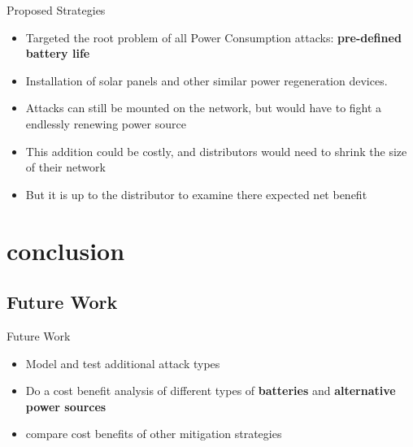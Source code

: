 \documentclass{beamer}
\begin{document}
\begin{frame}{Proposed Strategies}

\begin{itemize}

	\item Targeted the root problem of all Power Consumption attacks: \textbf{pre-defined battery life}
	\item Installation of solar panels and other similar power regeneration devices.
	\item Attacks can still be mounted on the network, but would have to fight a endlessly renewing power source 
	\item This addition could be costly, and distributors would need to shrink the size of their network
	\item But it is up to the distributor to examine there expected net benefit
	
\end{itemize}

\end{frame}

\section{conclusion}

\subsection{Future Work}
\begin{frame}{Future Work}
\begin{itemize}

	\item Model and test additional attack types 
	\item Do a cost benefit analysis of different types of \textbf{batteries} and \textbf{alternative power sources}
	\item compare cost benefits of other mitigation strategies 

\end{itemize}
\end{frame}	
\end{document}

